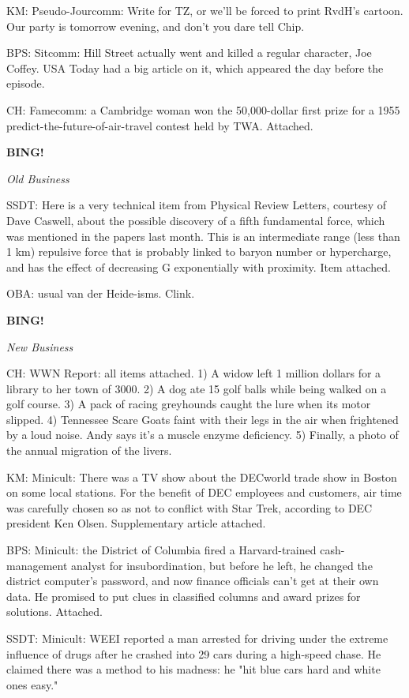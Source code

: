 \documentclass[12pt]{article}
\newcommand{\bing}{{\bf BING!} }
\newcommand{\goto}[1]{\bing \vskip 12pt \centerline{{\em{#1}}}}
\begin{document}
KM: Pseudo-Jourcomm: Write for TZ, or we'll be forced to print RvdH's cartoon. Our party is tomorrow evening, and don't you dare tell Chip.

BPS: Sitcomm: Hill Street actually went and killed a regular character, Joe Coffey. USA Today had a big article on it, which appeared the day before the episode.

CH: Famecomm: a Cambridge woman won the 50,000-dollar first prize for a 1955 predict-the-future-of-air-travel contest held by TWA. Attached.

\goto{Old Business}

SSDT: Here is a very technical item from Physical Review Letters, courtesy of Dave Caswell, about the possible discovery of a fifth fundamental force, which was mentioned in the papers last month. This is an intermediate range (less than 1 km) repulsive force that is probably linked to baryon number or hypercharge, and has the effect of decreasing G exponentially with proximity. Item attached.

OBA: usual van der Heide-isms. Clink.

\goto{New Business}

CH: WWN Report: all items attached. 1) A widow left 1 million dollars for a library to her town of 3000. 2) A dog ate 15 golf balls while being walked on a golf course. 3) A pack of racing greyhounds caught the lure when its motor slipped. 4) Tennessee Scare Goats faint with their legs in the air when frightened by a loud noise. Andy says it's a muscle enzyme deficiency. 5) Finally, a photo of the annual migration of the livers.

KM: Minicult: There was a TV show about the DECworld trade show in Boston on some local stations. For the benefit of DEC employees and customers, air time was carefully chosen so as not to conflict with Star Trek, according to DEC president Ken Olsen. Supplementary article attached.

BPS: Minicult: the District of Columbia fired a Harvard-trained cash-management analyst for insubordination, but before he left, he changed the district computer's password, and now finance officials can't get at their own data. He promised to put clues in classified columns and award prizes for solutions. Attached.

SSDT: Minicult: WEEI reported a man arrested for driving under the extreme influence of drugs after he crashed into 29 cars during a high-speed chase. He claimed there was a method to his madness: he "hit blue cars hard and white ones easy."
\end{document}
